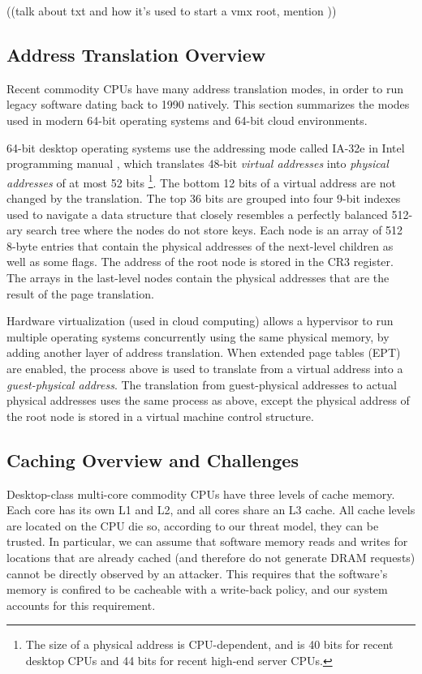 ((talk about txt and how it's used to start a vmx root, mention
\cite{vasudevan2010hypervisor}))


\subsection{Address Translation Overview}

Recent commodity CPUs have many address translation modes, in order to run
legacy software dating back to 1990 natively. This section summarizes the modes
used in modern 64-bit operating systems and 64-bit cloud environments.

64-bit desktop operating systems use the addressing mode called IA-32e in
Intel programming manual \cite{intel2013manual}, which translates 48-bit
\textit{virtual addresses} into \textit{physical addresses} of at most 52 bits
\footnote{The size of a physical address is CPU-dependent, and is 40 bits for
recent desktop CPUs and 44 bits for recent high-end server CPUs.}. The bottom
12 bits of a virtual address are not changed by the translation. The top 36
bits are grouped into four 9-bit indexes used to navigate a data structure that
closely resembles a perfectly balanced 512-ary search tree where the nodes do
not store keys. Each node is an array of 512 8-byte entries that contain the
physical addresses of the next-level children as well as some flags. The
address of the root node is stored in the CR3 register. The arrays in the
last-level nodes contain the physical addresses that are the result of the page
translation.

Hardware virtualization (used in cloud computing) allows a hypervisor to run
multiple operating systems concurrently using the same physical memory, by
adding another layer of address translation. When extended page tables (EPT)
are enabled, the process above is used to translate from a virtual address into
a \textit{guest-physical address}. The translation from guest-physical
addresses to actual physical addresses uses the same process as above, except
the physical address of the root node is stored in a virtual machine control
structure.


\subsection{Caching Overview and Challenges}

Desktop-class multi-core commodity CPUs have three levels of cache memory. Each
core has its own L1 and L2, and all cores share an L3 cache. All cache levels
are located on the CPU die so, according to our threat model, they can be
trusted. In particular, we can assume that software memory reads and writes for
locations that are already cached (and therefore do not generate DRAM requests)
cannot be directly observed by an attacker. This requires that the software's
memory is confired to be cacheable with a write-back policy, and our system
accounts for this requirement.

